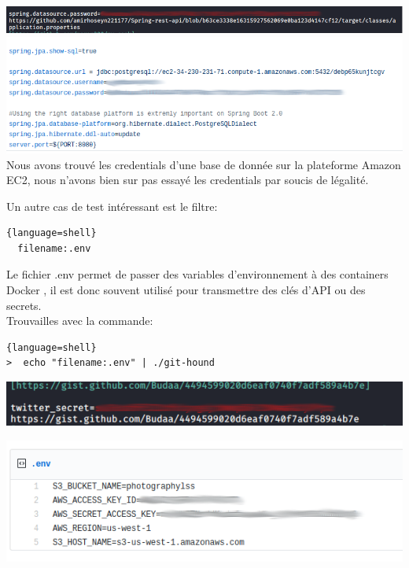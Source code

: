 \includegraphics[scale=0.48]{images/SEN_Projet_Image015.png} \\

\includegraphics[scale=0.48]{images/SEN_Projet_Image016.png} \\

Nous avons trouvé les credentials d'une base de donnée sur la plateforme Amazon EC2, nous n'avons bien sur pas essayé les credentials par soucis de légalité.

Un autre cas de test intéressant est le filtre:

\begin{lstlisting}{language=shell}
  filename:.env
\end{lstlisting}

Le fichier .env permet de passer des variables d'environnement à des containers Docker , il est donc souvent utilisé pour transmettre des clés d'API ou des secrets.
\\

Trouvailles avec la commande:

\begin{lstlisting}{language=shell}
>  echo "filename:.env" | ./git-hound
\end{lstlisting}

\includegraphics[scale=0.48]{images/SEN_Projet_Image017.png}

\includegraphics[scale=0.48]{images/SEN_Projet_Image018.png}

